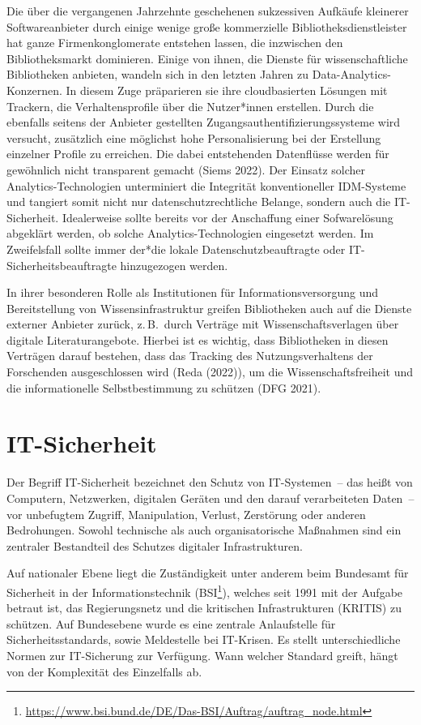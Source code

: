 \documentclass[
  11pt,
  letterpaper,
  DIV=11,
  twoside]{scrreprt}
\DeclareRobustCommand{\href}[2]{#2\footnote{\url{#1}}}
\begin{document}
Die über die vergangenen Jahrzehnte geschehenen sukzessiven Aufkäufe
kleinerer Softwareanbieter durch einige wenige große kommerzielle
Bibliotheksdienstleister hat ganze Firmenkonglomerate entstehen lassen,
die inzwischen den Bibliotheksmarkt dominieren. Einige von ihnen, die
Dienste für wissenschaftliche Bibliotheken anbieten, wandeln sich in den
letzten Jahren zu Data-Analytics-Konzernen. In diesem Zuge präparieren
sie ihre cloudbasierten Lösungen mit Trackern, die Verhaltensprofile
über die Nutzer*innen erstellen. Durch die ebenfalls seitens der
Anbieter gestellten Zugangsauthentifizierungssysteme wird versucht,
zusätzlich eine möglichst hohe Personalisierung bei der Erstellung
einzelner Profile zu erreichen. Die dabei entstehenden Datenflüsse
werden für gewöhnlich nicht transparent gemacht (Siems 2022). Der
Einsatz solcher Analytics-Technologien unterminiert die Integrität
konventioneller IDM-Systeme und tangiert somit nicht nur
datenschutzrechtliche Belange, sondern auch die IT-Sicherheit.
Idealerweise sollte bereits vor der Anschaffung einer Sofwarelösung
abgeklärt werden, ob solche Analytics-Technologien eingesetzt werden. Im
Zweifelsfall sollte immer der*die lokale Datenschutzbeauftragte oder
IT-Sicherheitsbeauftragte hinzugezogen werden.

In ihrer besonderen Rolle als Institutionen für Informationsversorgung
und Bereitstellung von Wissensinfrastruktur greifen Bibliotheken auch
auf die Dienste externer Anbieter zurück, z.\,B.~durch Verträge mit
Wissenschaftsverlagen über digitale Literaturangebote. Hierbei ist es
wichtig, dass Bibliotheken in diesen Verträgen darauf bestehen, dass das
Tracking des Nutzungsverhaltens der Forschenden ausgeschlossen wird
(Reda (2022)), um die Wissenschaftsfreiheit und die informationelle
Selbstbestimmung zu schützen (DFG 2021).

\section{IT-Sicherheit}\label{it-sicherheit}

Der Begriff IT-Sicherheit bezeichnet den Schutz von IT-Systemen~-- das
heißt von Computern, Netzwerken, digitalen Geräten und den darauf
verarbeiteten Daten~-- vor unbefugtem Zugriff, Manipulation, Verlust,
Zerstörung oder anderen Bedrohungen. Sowohl technische als auch
organisatorische Maßnahmen sind ein zentraler Bestandteil des Schutzes
digitaler Infrastrukturen.

Auf nationaler Ebene liegt die Zuständigkeit unter anderem beim
Bundesamt für Sicherheit in der Informationstechnik
(\href{https://www.bsi.bund.de/DE/Das-BSI/Auftrag/auftrag_node.html}{BSI}),
welches seit 1991 mit der Aufgabe betraut ist, das Regierungsnetz und
die kritischen Infrastrukturen (KRITIS) zu schützen. Auf Bundesebene
wurde es eine zentrale Anlaufstelle für Sicherheitsstandards, sowie
Meldestelle bei IT-Krisen. Es stellt unterschiedliche Normen zur
IT-Sicherung zur Verfügung. Wann welcher Standard greift, hängt von der
Komplexität des Einzelfalls ab.
\end{document}
